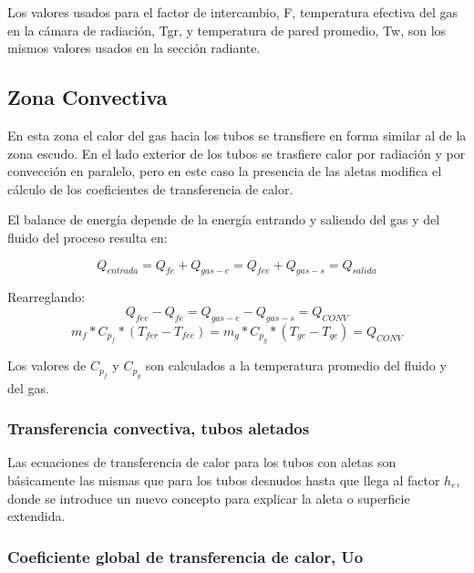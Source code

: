 \par Los valores usados para el factor de intercambio, F, temperatura efectiva del gas en la cámara de radiación, Tgr, y temperatura de pared promedio, Tw, son los mismos valores usados en la sección radiante.

\subsection{Zona Convectiva}
\par En esta zona el calor del gas hacia los tubos se transfiere en forma similar al de la zona escudo. En el lado exterior de los tubos se trasfiere calor por radiación y por convección en paralelo, pero en este caso la presencia de las aletas modifica el cálculo de los coeficientes de transferencia de calor.

\par El balance de energía depende de la energía entrando y saliendo del gas y del fluido del proceso resulta en:

\begin{equation}
\label{eq:conv}
Q_{entrada} = Q_{fe} + Q_{gas-e} = Q_{fee} + Q_{gas-s} = Q_{salida}
\end{equation}

\par Rearreglando:
\begin{equation*}
Q_{fee} - Q_{fe} = Q_{gas-e} - Q_{gas-s} = Q_{CONV}
\end{equation*}
\begin{equation}
\label{eq:qconv}
m_{f} *C_{p_f} *(T_{fer} - T_{fee}) = 
m_{g} *C_{p_g} *(T_{ge}  - T_{gc}) = Q_{CONV}
\end{equation}
\par Los valores de $C_{p_f}$ y $C_{p_g}$ son calculados a la temperatura promedio del fluido y del gas.

\subsubsection{Transferencia convectiva, tubos aletados}
\par Las ecuaciones de transferencia de calor para los tubos con aletas son básicamente las mismas que para los tubos desnudos hasta que llega al factor $h_e$, donde se introduce un nuevo concepto para explicar la aleta o superficie extendida.

\subsubsection{Coeficiente global de transferencia de calor, Uo}

